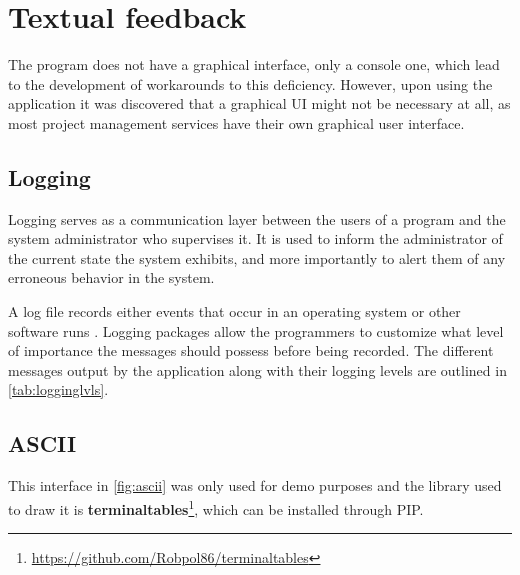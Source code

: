 \documentclass[12pt]{report}
\theoremstyle{definition}
\theoremstyle{remark}
\begin{document}
\section{Textual feedback}
The program does not have a graphical interface, only a console one, which lead to the development of workarounds to this deficiency. However, upon using the application it was discovered that a graphical UI might not be necessary at all, as most project management services have their own graphical user interface.
\subsection{Logging}
Logging serves as a communication layer between the users of a program and the system administrator who supervises it. It is used to inform the administrator of the current state the system exhibits, and more importantly to alert them of any erroneous behavior in the system.

A log file records either events that occur in an operating system or other software runs \cite{logging}. Logging packages allow the programmers to customize what level of importance the messages should possess before being recorded. The different messages output by the application along with their logging levels are outlined in \autoref{tab:logginglvls}.

\subsection{ASCII}
This interface in \autoref{fig:ascii} was only used for demo purposes and the library used to draw it is \textbf{terminaltables}\footnote{\url{https://github.com/Robpol86/terminaltables}}, which can be installed through PIP.
\end{document}
